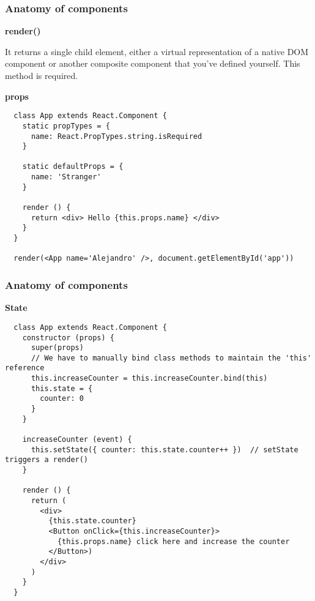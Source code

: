\begin{frame}[fragile]

  \frametitle{Anatomy of components}
  \textbf{render()}

  \small It returns a single child element, either a virtual representation of a native DOM component or another composite component that you've defined yourself. This method is required.

  \textbf{props}
  \begin{verbatim}
  class App extends React.Component {
    static propTypes = {
      name: React.PropTypes.string.isRequired
    }

    static defaultProps = {
      name: 'Stranger'
    }

    render () {
      return <div> Hello {this.props.name} </div>
    }
  }

  render(<App name='Alejandro' />, document.getElementById('app'))
  \end{verbatim}

\end{frame}

\begin{frame}[fragile]

  \frametitle{Anatomy of components}

  \textbf{State}
  \begin{verbatim}
  class App extends React.Component {
    constructor (props) {
      super(props)
      // We have to manually bind class methods to maintain the 'this' reference
      this.increaseCounter = this.increaseCounter.bind(this)
      this.state = {
        counter: 0
      }
    }

    increaseCounter (event) {
      this.setState({ counter: this.state.counter++ })  // setState triggers a render()
    }

    render () {
      return (
        <div>
          {this.state.counter}
          <Button onClick={this.increaseCounter}>
            {this.props.name} click here and increase the counter
          </Button>)
        </div>
      )
    }
  }
  \end{verbatim}

\end{frame}

